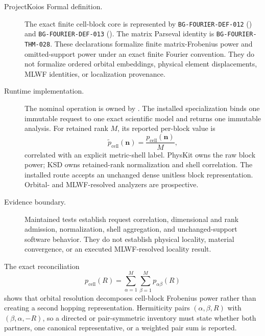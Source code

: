 \begin{definitioncrosswalk}
\begin{description}
  \item[ProjectKoios Formal definition.]
  The exact finite cell-block core is represented by
  \texttt{BG-FOURIER-DEF-012}
  () and
  \texttt{BG-FOURIER-DEF-013}
  (). The matrix Parseval identity is
  \texttt{BG-FOURIER-THM-028}. These declarations formalize finite
  matrix-Frobenius power and omitted-support power under an exact finite Fourier
  convention. They do not formalize ordered orbital embeddings, physical
  element displacements, MLWF identities, or localization provenance.

  \item[Runtime implementation.]
  The nominal operation is owned by
  . The installed
   specialization binds
  one immutable request to one exact scientific model and returns one immutable
  analysis. For retained rank $M$, its reported per-block value is
  \begin{equation*}
    \widetilde p_{\mathrm{cell}}(\mathbf n)
    =\frac{p_{\mathrm{cell}}(\mathbf n)}{M},
  \end{equation*}
  correlated with an explicit metric-shell label. PhysKit owns the raw block
  power; KSD owns retained-rank normalization and shell correlation. The
  installed route accepts an unchanged dense unitless block representation.
  Orbital- and MLWF-resolved analyzers are prospective.

  \item[Evidence boundary.]
  Maintained tests establish request correlation, dimensional and rank
  admission, normalization, shell aggregation, and unchanged-support software
  behavior. They do not establish physical locality, material convergence, or
  an executed MLWF-resolved locality result.
\end{description}
\end{definitioncrosswalk}

The exact reconciliation
\begin{equation}
  p_{\mathrm{cell}}(R)
  =\sum_{\alpha=1}^{M}\sum_{\beta=1}^{M}p_{\alpha\beta}(R)
  \label{eq:training-locality-resolution-reconciliation}
\end{equation}
shows that orbital resolution decomposes cell-block Frobenius power rather than
creating a second hopping representation. Hermiticity pairs
$(\alpha,\beta,R)$ with $(\beta,\alpha,-R)$, so a directed or pair-symmetric
inventory must state whether both partners, one canonical representative, or a
weighted pair sum is reported.

